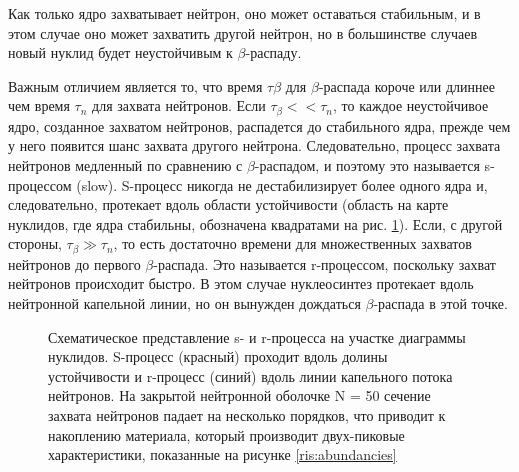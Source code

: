 \documentclass[14pt, a4paper]{article}
\numberwithin{figure}{section}
\numberwithin{equation}{section}
\begin{document}
Как только ядро захватывает нейтрон, оно может оставаться стабильным, и в этом случае оно может захватить другой нейтрон, но в большинстве случаев новый нуклид будет неустойчивым к $\beta$-распаду.

Важным отличием является то, что время $\tau\beta$ для $\beta$-распада короче или длиннее чем время $\tau_n$ для захвата нейтронов. Если $\tau_\beta << \tau_n$, то каждое неустойчивое ядро, созданное захватом нейтронов, распадется до стабильного ядра, прежде чем у него появится шанс захвата другого нейтрона. Следовательно, процесс захвата нейтронов медленный по сравнению с $\beta$-распадом, и поэтому это называется s-процессом (slow). S-процесс никогда не дестабилизирует более одного ядра и, следовательно, протекает вдоль области устойчивости (область на карте нуклидов, где ядра стабильны, обозначена квадратами на рис. \ref{ris:6}). Если, с другой стороны, $\tau_\beta \gg \tau_n$, то есть достаточно времени для множественных захватов нейтронов до первого $\beta$-распада. Это называется r-процессом, поскольку захват нейтронов происходит быстро. В этом случае нуклеосинтез протекает вдоль нейтронной капельной линии, но он вынужден дождаться $\beta$-распада в этой точке.

\begin{figure}[ht]
	\caption{Схематическое представление s- и r-процесса на участке диаграммы нуклидов. S-процесс (красный) проходит вдоль долины устойчивости и r-процесс (синий) вдоль линии капельного потока нейтронов. На закрытой нейтронной оболочке N = 50 сечение захвата нейтронов падает на несколько порядков, что приводит к накоплению материала, который производит двух-пиковые характеристики, показанные на рисунке \ref{ris:abundancies}}
	\label{ris:6}
\end{figure}
\end{document}
